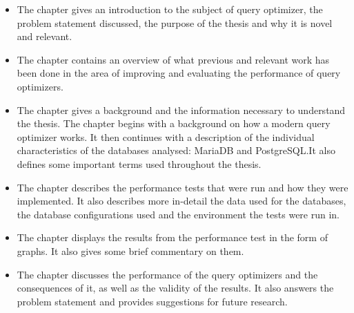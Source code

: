\begin{itemize}
    \item The  chapter gives an introduction to the subject of query optimizer, the problem statement discussed, the purpose of the thesis and why it is novel and relevant.
    \item The  chapter contains an overview of what previous and relevant work has been done in the area of improving and evaluating the performance of query optimizers.
    \item The  chapter gives a background and the information necessary to understand the thesis. The chapter begins with a background on how a modern query optimizer works. It then continues with a description of the individual characteristics of the databases analysed: MariaDB and PostgreSQL.\@ It also defines some important terms used throughout the thesis.
    \item The  chapter describes the performance tests that were run and how they were implemented. It also describes more in-detail the data used for the databases, the database configurations used and the environment the tests were run in.
    \item The  chapter displays the results from the performance test in the form of graphs. It also gives some brief commentary on them.
    \item The  chapter discusses the performance of the query optimizers and the consequences of it, as well as the validity of the results. It also answers the problem statement and provides suggestions for future research.
\end{itemize}